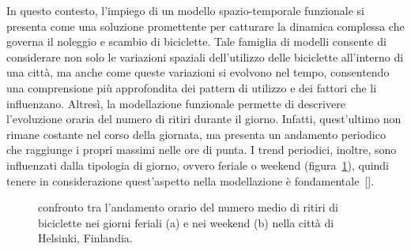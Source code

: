 \par In questo contesto, l'impiego di un modello spazio-temporale funzionale si presenta come una soluzione promettente per catturare la dinamica complessa che governa il noleggio e scambio di biciclette. Tale famiglia di modelli consente di considerare non solo le variazioni spaziali dell'utilizzo delle biciclette all'interno di una città, ma anche come queste variazioni si evolvono nel tempo, consentendo una comprensione più approfondita dei pattern di utilizzo e dei fattori che li influenzano. Altresì, la modellazione funzionale permette di descrivere l'evoluzione oraria del numero di ritiri durante il giorno. Infatti, quest'ultimo non rimane costante nel corso della giornata, ma presenta un andamento periodico che raggiunge i propri massimi nelle ore di punta. I trend periodici, inoltre, sono influenzati dalla tipologia di giorno, ovvero feriale o weekend (figura~\ref{trend_paper_Otto}), quindi tenere in considerazione quest'aspetto nella modellazione è fondamentale~[\cite{paper_bike_sharing_Otto}].

\begin{figure}[h!]
	\centering
	\quad
	\quad
	\caption[Confronto tra l'andamento orario del numero medio di ritiri nei giorni feriali e nei weekend a Helsinki]{confronto tra l'andamento orario del numero medio di ritiri di biciclette nei giorni feriali (a) e nei weekend (b) nella città di Helsinki, Finlandia.}
	\label{trend_paper_Otto}
\end{figure}

